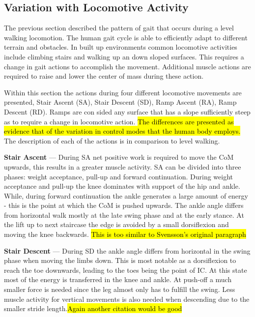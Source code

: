 \subsection{Variation with Locomotive Activity}
The previous section described the pattern of gait that occurs during a level walking locomotion. The human gait cycle is able to efficiently adapt to different terrain and obstacles. In built up environments common locomotive activities include climbing stairs and walking up an down sloped surfaces. This requires a change in gait actions to accomplish the movement. Additional muscle actions are required to raise and lower the center of mass during these action\cite{Franz2012a}. 

Within this section the actions during four different locomotive movements are presented, Stair Ascent (SA), Stair Descent (SD), Ramp Ascent (RA), Ramp Descent (RD). Ramps are con sided any surface that has a slope sufficiently steep as to require a change in locomotive action. \hl{The differences are presented as evidence that of the variation in control modes that the human body employs.} %
The description of each of the actions is in comparison to level walking.

\textbf{Stair Ascent} --- During SA net positive work is required to move the CoM upwards, this results in a greater muscle activity. SA can be divided into three phases: weight acceptance, pull-up and forward continuation. During weight acceptance and pull-up the knee dominates with support of the hip and ankle. While, during forward continuation the ankle generates a large amount of energy - this is the point at which the CoM is pushed upwards. The ankle angle differs from horizontal walk mostly at the late swing phase and at the early stance. At the lift up to next staircase the edge is avoided by a small dorsiflexion and moving the knee backwards.\cite{Svensson2007} \hl{This is too similar to Svensson's original paragraph} 

\textbf{Stair Descent} --- During SD the ankle angle differs from horizontal in the swing phase when moving the limbs down. This is most notable as a dorsiflexion to reach the toe downwards, leading to the toes being the point of IC. At this state most of the energy is transferred in the knee and ankle. At push-off a much smaller force is needed since the leg almost only has to fulfill the swing. Less muscle activity for vertical movements is also needed when descending due to the smaller stride length.\cite{Svensson2007}\hl{Again another citation would be good}

